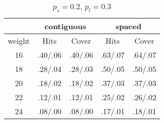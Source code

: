 \begin{table}[t]
\begin{subtable}{0.4\textwidth}
\centering
\begin{tabular}{|c|c|c|c|c|}
\hline
&\multicolumn{2}{|c|}{contiguous}&
\multicolumn{2}{|c|}{spaced}\\
\hline
weight&Hits&Cover&Hits&Cover\\
\hline
16 & .40/.06 & .40/.06 & .63/.07 & .64/.07 \\
18 & .28/.04 & .28/.03 & .50/.05 & .50/.05 \\
20 & .18/.02 & .18/.02 & .37/.03 & .37/.03 \\
22 & .12/.01 & .12/.01 & .25/.02 & .26/.02 \\
24 & .08/.00 & .08/.00 & .17/.01 & .18/.01 \\
\hline
\end{tabular}
\caption{$p_s=0.2$, $p_l=0.3$\label{0203}}
\end{subtable}
\end{table}